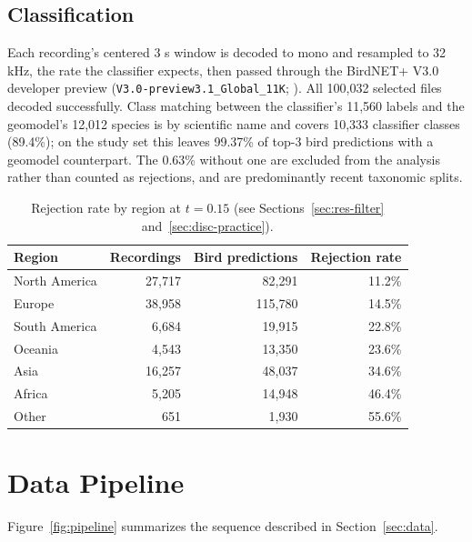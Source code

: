 \subsection{Classification}
\label{sec:F-3-classification}

Each recording's centered 3 s window is decoded to mono and resampled to 32 kHz, the rate the classifier expects, then passed through the BirdNET+ V3.0 developer preview (\texttt{V3.0-preview3.1\_Global\_11K}; \citealp{lasseck2026birdnetv3}). All 100,032 selected files decoded successfully. Class matching between the classifier's 11,560 labels and the geomodel's 12,012 species is by scientific name and covers 10,333 classifier classes (89.4\%); on the study set this leaves 99.37\% of top-3 bird predictions with a geomodel counterpart. The 0.63\% without one are excluded from the analysis rather than counted as rejections, and are predominantly recent taxonomic splits.


\begin{table}[H]
\centering
\caption{Rejection rate by region at $t = 0.15$ (see Sections~\ref{sec:res-filter} and~\ref{sec:disc-practice}).}
\label{tab:f-3}
\small
\begin{tabular}{lrrr}
\toprule
Region & Recordings & Bird predictions & Rejection rate \\
\midrule
North America & 27,717 & 82,291 & 11.2\% \\
Europe & 38,958 & 115,780 & 14.5\% \\
South America & 6,684 & 19,915 & 22.8\% \\
Oceania & 4,543 & 13,350 & 23.6\% \\
Asia & 16,257 & 48,037 & 34.6\% \\
Africa & 5,205 & 14,948 & 46.4\% \\
Other & 651 & 1,930 & 55.6\% \\
\bottomrule
\end{tabular}
\end{table}


\section{Data Pipeline}
\label{sec:G-data-pipeline-diagram}

Figure~\ref{fig:pipeline} summarizes the sequence described in Section~\ref{sec:data}.

